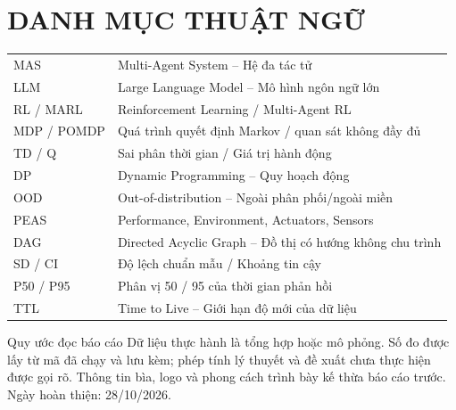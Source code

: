 \documentclass[12pt,a4paper]{article}
\begin{document}

\setcounter{tocdepth}{2}
{\linespread{1.0}\selectfont\tableofcontents}
\clearpage\listoffigures\clearpage
\section*{DANH MỤC THUẬT NGỮ}
\begin{tabularx}{\linewidth}{p{2.5cm}X}
\toprule
MAS & Multi-Agent System -- Hệ đa tác tử\\
LLM & Large Language Model -- Mô hình ngôn ngữ lớn\\
RL / MARL & Reinforcement Learning / Multi-Agent RL\\
MDP / POMDP & Quá trình quyết định Markov / quan sát không đầy đủ\\
TD / Q & Sai phân thời gian / Giá trị hành động\\
DP & Dynamic Programming -- Quy hoạch động\\
OOD & Out-of-distribution -- Ngoài phân phối/ngoài miền\\
PEAS & Performance, Environment, Actuators, Sensors\\
DAG & Directed Acyclic Graph -- Đồ thị có hướng không chu trình\\
SD / CI & Độ lệch chuẩn mẫu / Khoảng tin cậy\\
P50 / P95 & Phân vị 50 / 95 của thời gian phản hồi\\
TTL & Time to Live -- Giới hạn độ mới của dữ liệu\\
\bottomrule
\end{tabularx}
\vspace{8mm}
\begin{academicbox}{Quy ước đọc báo cáo}
Dữ liệu thực hành là tổng hợp hoặc mô phỏng. Số đo được lấy từ mã đã chạy và lưu kèm; phép tính lý thuyết và đề xuất chưa thực hiện được gọi rõ. Thông tin bìa, logo và phong cách trình bày kế thừa báo cáo trước. Ngày hoàn thiện: 28/10/2026.
\end{academicbox}
\clearpage{}\setcounter{page}{1}

\clearpage

\clearpage

\clearpage

\clearpage


\end{document}
